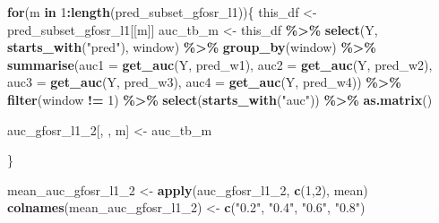 \documentclass[
]{article}
\newenvironment{Shaded}{\begin{snugshade}}{\end{snugshade}}
\newcommand{\AttributeTok}[1]{\textcolor[rgb]{0.13,0.29,0.53}{#1}}
\newcommand{\ControlFlowTok}[1]{\textcolor[rgb]{0.13,0.29,0.53}{\textbf{#1}}}
\newcommand{\DecValTok}[1]{\textcolor[rgb]{0.00,0.00,0.81}{#1}}
\newcommand{\FunctionTok}[1]{\textcolor[rgb]{0.13,0.29,0.53}{\textbf{#1}}}
\newcommand{\NormalTok}[1]{#1}
\newcommand{\OtherTok}[1]{\textcolor[rgb]{0.56,0.35,0.01}{#1}}
\newcommand{\SpecialCharTok}[1]{\textcolor[rgb]{0.81,0.36,0.00}{\textbf{#1}}}
\newcommand{\StringTok}[1]{\textcolor[rgb]{0.31,0.60,0.02}{#1}}
\begin{document}
\begin{Shaded}
\begin{Highlighting}[]
\ControlFlowTok{for}\NormalTok{(m }\ControlFlowTok{in} \DecValTok{1}\SpecialCharTok{:}\FunctionTok{length}\NormalTok{(pred\_subset\_gfosr\_l1))\{}
\NormalTok{  this\_df }\OtherTok{\textless{}{-}}\NormalTok{ pred\_subset\_gfosr\_l1[[m]]}
\NormalTok{  auc\_tb\_m }\OtherTok{\textless{}{-}}\NormalTok{ this\_df }\SpecialCharTok{\%\textgreater{}\%}
  \FunctionTok{select}\NormalTok{(Y, }\FunctionTok{starts\_with}\NormalTok{(}\StringTok{"pred"}\NormalTok{), window) }\SpecialCharTok{\%\textgreater{}\%}
  \FunctionTok{group\_by}\NormalTok{(window) }\SpecialCharTok{\%\textgreater{}\%}
  \FunctionTok{summarise}\NormalTok{(}\AttributeTok{auc1 =} \FunctionTok{get\_auc}\NormalTok{(Y, pred\_w1),}
            \AttributeTok{auc2 =} \FunctionTok{get\_auc}\NormalTok{(Y, pred\_w2),}
            \AttributeTok{auc3 =} \FunctionTok{get\_auc}\NormalTok{(Y, pred\_w3),}
            \AttributeTok{auc4 =} \FunctionTok{get\_auc}\NormalTok{(Y, pred\_w4)) }\SpecialCharTok{\%\textgreater{}\%}
  \FunctionTok{filter}\NormalTok{(window }\SpecialCharTok{!=} \DecValTok{1}\NormalTok{) }\SpecialCharTok{\%\textgreater{}\%} 
  \FunctionTok{select}\NormalTok{(}\FunctionTok{starts\_with}\NormalTok{(}\StringTok{"auc"}\NormalTok{)) }\SpecialCharTok{\%\textgreater{}\%} \FunctionTok{as.matrix}\NormalTok{()}
  
\NormalTok{  auc\_gfosr\_l1\_2[, , m] }\OtherTok{\textless{}{-}}\NormalTok{ auc\_tb\_m}
  
\NormalTok{\}}

\NormalTok{mean\_auc\_gfosr\_l1\_2 }\OtherTok{\textless{}{-}} \FunctionTok{apply}\NormalTok{(auc\_gfosr\_l1\_2, }\FunctionTok{c}\NormalTok{(}\DecValTok{1}\NormalTok{,}\DecValTok{2}\NormalTok{), mean)}
\FunctionTok{colnames}\NormalTok{(mean\_auc\_gfosr\_l1\_2) }\OtherTok{\textless{}{-}} \FunctionTok{c}\NormalTok{(}\StringTok{"0.2"}\NormalTok{, }\StringTok{"0.4"}\NormalTok{, }\StringTok{"0.6"}\NormalTok{, }\StringTok{"0.8"}\NormalTok{)}
\end{Highlighting}
\end{Shaded}
\end{document}

